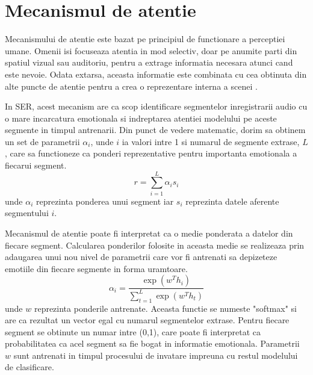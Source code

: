 \documentclass[a4paper,12pt]{book}
\begin{document}
				\section{Mecanismul de atentie} \label{attention}
				 Mecanismului de atentie este bazat  pe principiul de functionare a perceptiei umane. Omenii  isi focuseaza atentia in mod selectiv, doar pe anumite parti din spatiul vizual sau auditoriu, pentru a extrage informatia necesara atunci cand este nevoie. Odata extarsa, aceasta informatie este combinata cu cea obtinuta din alte puncte de atentie pentru a crea o reprezentare interna a scenei \cite{zhang, attention1}. \par
				In SER, acest mecanism are ca scop identificare segmentelor inregistrarii audio cu o mare incarcatura emotionala si indreptarea atentiei modelului pe aceste segmente in timpul antrenarii. Din punct de vedere matematic, dorim sa obtinem un set de parametrii $\alpha_i$, unde $i$ ia valori intre 1 si numarul de segmente extrase, $L$, care sa functioneze ca ponderi reprezentative pentru importanta emotionala a fiecarui segment.
				\begin{equation}
					r = \sum_{i=1}^{L} \alpha_i s_i
				\end{equation}
				unde $\alpha_i$ reprezinta ponderea unui segment iar $s_i$ reprezinta datele aferente segmentului $i$. \par
				Mecanismul de atentie poate fi interpretat ca o medie ponderata a datelor din fiecare segment. Calcularea ponderilor folosite in aceasta medie se realizeaza prin adaugarea unui nou nivel de parametrii care vor fi antrenati sa depizeteze emotiile din fiecare segmente in forma uramtoare.
				\begin{equation} \label{softmax_form}
					\alpha_i = \frac{\exp(w^Th_i)}{\sum_{t=1}^{L} \exp(w^Th_t)}
				\end{equation}
				unde $w$ reprezinta ponderile antrenate.
				Aceasta functie se numeste "softmax" si are ca rezultat un vector egal cu numarul segmentelor extrase. Pentru fiecare segment se obtinute un numar intre (0,1), care poate fi interpretat ca probabilitatea ca acel segment sa fie bogat in informatie emotionala.  Parametrii $w$ sunt antrenati in timpul procesului de invatare impreuna cu restul modelului de clasificare.
		
\end{document}
